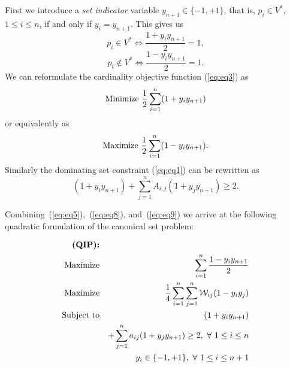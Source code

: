 \documentclass{ieee}
\def\W{{\cal W}}
\begin{document}
First we introduce a \emph{set indicator} variable
$y_{n+1}\in\{-1,+1\}$, that is, $p_i\in V^*$, $1\le i\le n$, if and only if
$y_i=y_{n+1}$.  This gives us
$$p_i \in V^* \Leftrightarrow \frac{1+y_iy_{n+1}}{2}=1,$$
\begin{equation}
\label{eq:eq6}
p_i \notin V^* \Leftrightarrow \frac{1-y_iy_{n+1}}{2}=1.
\end{equation}
We can reformulate the cardinality objective function (\ref{eq:eq3}) as
\begin{equation}
\label{eq:eq7}
{\rm Minimize}\ {\frac{1}{2}}\sum_{i=1}^n (1+y_iy_{n+1}) 
\end{equation}
or equivalently as               
\begin{equation}
\label{eq:eq8}
{\rm Maximize}\ {\frac{1}{2}}\sum_{i=1}^n (1-y_iy_{n+1}).
\end{equation}
Similarly the dominating set constraint (\ref{eq:eq1}) can be rewritten as
\begin{equation}
\label{eq:eq9}
 (1+y_iy_{n+1})+\sum_{j=1}^n A_{i,j}(1+y_jy_{n+1})\ge 2.
\end{equation}
                                          
                                          
Combining~(\ref{eq:eq5}),~(\ref{eq:eq8}), and~(\ref{eq:eq9}) we 
arrive at the following quadratic formulation of the canonical set
problem:

\begin{eqnarray*} 
{\textbf{(QIP):}}\\
{\rm Maximize} && {\displaystyle \sum_{i=1}^n \frac{1-y_iy_{n+1}}{2}} \\
{\rm Maximize} && {\displaystyle{\frac{1}{4}}\sum_{i=1}^n\sum_{j=1}^n \W_{ij}(1-y_iy_j)} \\
{\rm Subject\ to} && {\displaystyle (1+y_iy_{n+1})}\\
                  && {\displaystyle  +\sum_{j=1}^n a_{ij}({1+y_jy_{n+1}}) \ge 2}, \ \forall\ 1\le i\le n \nonumber\\
 &&  y_i\in\{-1,+1\},\ \forall\  1\le i\le n+1
\end{eqnarray*}

\vspace{-0.1in}
% 
\end{document}
